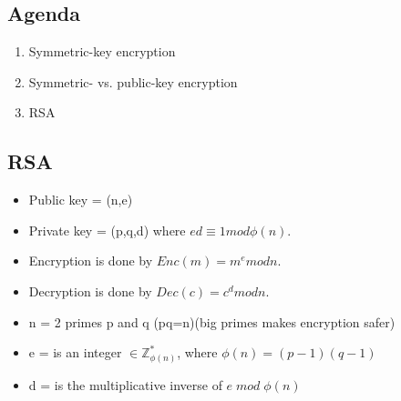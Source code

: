 

\subsection{Agenda}
\begin{enumerate}
\item Symmetric-key encryption
\item Symmetric- vs. public-key encryption
\item RSA
\end{enumerate}
\subsection*{RSA}
\begin{itemize}
\item Public key = (n,e) 
\item Private key = (p,q,d) where $ed \equiv 1 mod \phi (n)$.
\item Encryption is done by $Enc(m)= m^e mod n$.
\item Decryption is done by $Dec(c)=c^d mod n$.	
\item n = 2 primes p and q (pq=n)(big primes makes encryption safer)
\item e = is an integer $\in \mathbb{Z}^*_{\phi (n)}$, where $\phi (n)=(p-1)(q-1)$
\item d = is the multiplicative inverse of $e\; mod\;\phi (n)$
\end{itemize}
